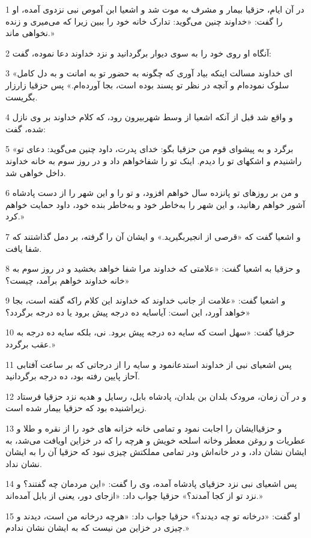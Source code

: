 \par 1 در آن ایام، حزقیا بیمار و مشرف به موت شد و اشعیا ابن آموص نبی نزدوی آمده، او را گفت: «خداوند چنین می‌گوید: تدارک خانه خود را ببین زیرا که می‌میری و زنده نخواهی ماند.»
\par 2 آنگاه او روی خود را به سوی دیوار برگردانید و نزد خداوند دعا نموده، گفت:
\par 3 «ای خداوند مسالت اینکه بیاد آوری که چگونه به حضور تو به امانت و به دل کامل سلوک نموده‌ام و آنچه در نظر تو پسند بوده است، بجا آورده‌ام.» پس حزقیا زارزار بگریست.
\par 4 و واقع شد قبل از آنکه اشعیا از وسط شهربیرون رود، که کلام خداوند بر وی نازل شده، گفت:
\par 5 «برگرد و به پیشوای قوم من حزقیا بگو: خدای پدرت، داود چنین می‌گوید: دعای تو راشنیدم و اشکهای تو را دیدم. اینک تو را شفاخواهم داد و در روز سوم به خانه خداوند داخل خواهی شد. 
\par 6 و من بر روزهای تو پانزده سال خواهم افزود، و تو را و این شهر را از دست پادشاه آشور خواهم رهانید، و این شهر را به‌خاطر خود و به‌خاطر بنده خود، داود حمایت خواهم کرد.»
\par 7 و اشعیا گفت که «قرصی از انجیربگیرید.» و ایشان آن را گرفته، بر دمل گذاشتند که شفا یافت.
\par 8 و حزقیا به اشعیا گفت: «علامتی که خداوند مرا شفا خواهد بخشید و در روز سوم به خانه خداوند خواهم برآمد، چیست؟»
\par 9 و اشعیا گفت: «علامت از جانب خداوند که خداوند این کلام راکه گفته است، بجا خواهد آورد، این است: آیاسایه ده درجه پیش برود یا ده درجه برگردد؟»
\par 10 حزقیا گفت: «سهل است که سایه ده درجه پیش برود. نی، بلکه سایه ده درجه به عقب برگردد.»
\par 11 پس اشعیای نبی از خداوند استدعانمود و سایه را از درجاتی که بر ساعت آفتابی آحاز پایین رفته بود، ده درجه برگردانید.
\par 12 و در آن زمان، مرودک بلدان بن بلدان، پادشاه بابل، رسایل و هدیه نزد حزقیا فرستاد زیراشنیده بود که حزقیا بیمار شده است.
\par 13 و حزقیاایشان را اجابت نمود و تمامی خانه خزانه های خود را از نقره و طلا و عطریات و روغن معطر وخانه اسلحه خویش و هرچه را که در خزاین اویافت می‌شد، به ایشان نشان داد، و در خانه‌اش ودر تمامی مملکتش چیزی نبود که حزقیا آن را به ایشان نشان نداد.
\par 14 پس اشعیای نبی نزد حزقیای پادشاه آمده، وی را گفت: «این مردمان چه گفتند؟ و نزد تو از کجا آمدند؟» حزقیا جواب داد: «ازجای دور، یعنی از بابل آمده‌اند.»
\par 15 او گفت: «درخانه تو چه دیدند؟» حزقیا جواب داد: «هرچه درخانه من است، دیدند و چیزی در خزاین من نیست که به ایشان نشان ندادم.»
